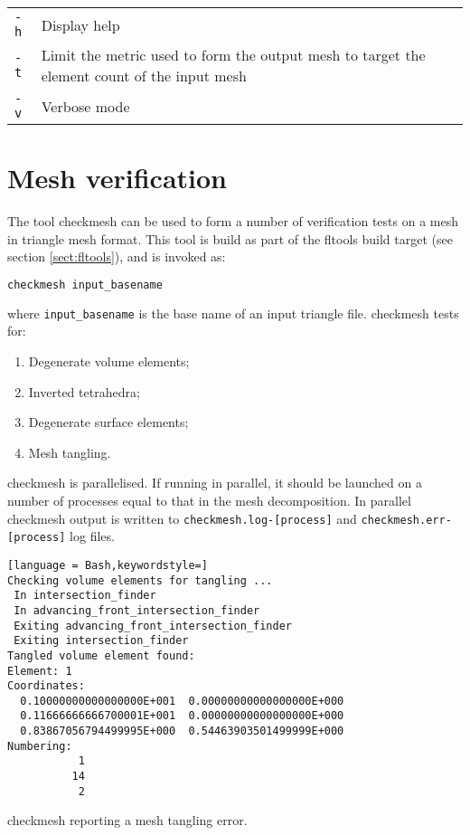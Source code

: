 \begin{center}
  \begin{tabular}{lp{}}
    \hline
    \lstinline+-h+   & Display help \\
    \lstinline+-t+   & Limit the metric used to form the output mesh to
    target the element count of the input mesh \\
    \lstinline+-v+   & Verbose mode \\
    \hline
  \end{tabular}
\end{center}

\section{Mesh verification}

The tool checkmesh can be used to form a number of verification tests on a mesh
in triangle mesh format. This tool is build as part of the fltools build target
(see section \ref{sect:fltools}), and is invoked as:

\begin{lstlisting}[language = Bash]
checkmesh input_basename
\end{lstlisting}

where \lstinline[language = Bash]*input_basename* is the base name of an input
triangle file. checkmesh tests for:

\begin{enumerate}
  \item Degenerate volume elements;
  \item Inverted tetrahedra;
  \item Degenerate surface elements;
  \item\label{item:mesh_tangling} Mesh tangling.
\end{enumerate}


checkmesh is parallelised. If running in parallel, it should be launched on
a number of processes equal to that in the mesh decomposition. In parallel
checkmesh output is written to \onlypdf\linebreak \lstinline+checkmesh.log-[process]+
and \lstinline+checkmesh.err-[process]+ log files.

\begin{example}
\begin{lstlisting}[language = Bash,keywordstyle=]
Checking volume elements for tangling ...
 In intersection_finder
 In advancing_front_intersection_finder
 Exiting advancing_front_intersection_finder
 Exiting intersection_finder
Tangled volume element found: 
Element: 1
Coordinates:
  0.10000000000000000E+001  0.00000000000000000E+000
  0.11666666666700001E+001  0.00000000000000000E+000
  0.83867056794499995E+000  0.54463903501499999E+000
Numbering:
           1
          14
           2
\end{lstlisting}
\caption{checkmesh reporting a mesh tangling error.}
\end{example}

